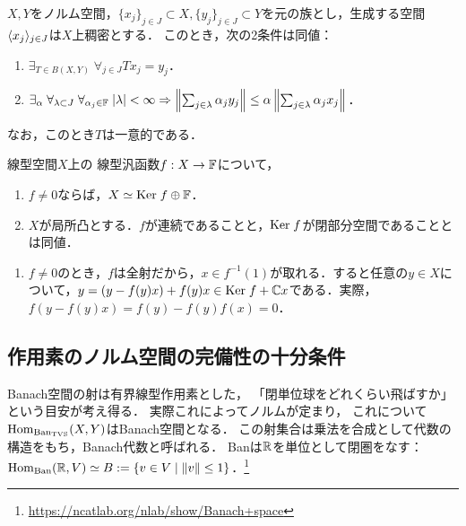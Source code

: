 \documentclass[uplatex,dvipdfmx]{jsreport}
\begin{document}
\begin{theorem}
    $X,Y$をノルム空間，$\{x_j\}_{j\in J}\subset X,\{y_j\}_{j\in J}\subset Y$を元の族とし，生成する空間$\langle x_j\rangle_{j\in J}$は$X$上稠密とする．
    このとき，次の2条件は同値：
    \begin{enumerate}
        \item $\exists_{T\in B(X,Y)}\;\forall_{j\in J}Tx_j=y_j$．
        \item $\exists_{\alpha}\;\forall_{\lambda\subset J}\;\forall_{\alpha_j\in\mathbb{F}}\;\lvert\lambda\rvert<\infty\Rightarrow\left\|\sum_{j\in\lambda}\alpha_jy_j\right\|\le\alpha\left\|\sum_{j\in\lambda}\alpha_jx_j\right\|$．
    \end{enumerate}
    なお，このとき$T$は一意的である．
\end{theorem}

\begin{proposition}[線型汎関数の連続性の特徴付け]
    線型空間$X$上の
    線型汎函数$f:X\to\mathbb{F}$について，
    \begin{enumerate}
        \item $f\ne 0$ならば，$X\simeq\mathrm{Ker}\; f\oplus\mathbb{F}$．
        \item $X$が局所凸とする．$f$が連続であることと，$\mathrm{Ker}\; f$が閉部分空間であることとは同値．
    \end{enumerate}
\end{proposition}
\begin{Proof}\mbox{}
    \begin{enumerate}
        \item $f\ne 0$のとき，$f$は全射だから，$x\in f^{-1}(1)$が取れる．すると任意の$y\in X$について，$y=(y-f(y)x)+f(y)x\in\mathrm{Ker}\; f+\mathbb{C} x$である．実際，$f(y-f(y)x)=f(y)-f(y)f(x)=0$．
    \end{enumerate}
\end{Proof}

\subsection{作用素のノルム空間の完備性の十分条件}

\begin{tcolorbox}[colframe=ForestGreen, colback=ForestGreen!10!white,breakable,colbacktitle=ForestGreen!40!white,coltitle=black,fonttitle=\bfseries\sffamily,
title=Banには内部homを持つ閉圏としての構造がある]
    Banach空間の射は有界線型作用素とした，
    「閉単位球をどれくらい飛ばすか」という目安が考え得る．
    実際これによってノルムが定まり，
    これについて$\mathrm{Hom}_{\mathrm{Ban}_{\mathrm{TVS}}}(X,Y)$はBanach空間となる．
    この射集合は乗法を合成として代数の構造をもち，Banach代数と呼ばれる．
    Banは$\mathbb{R}$を単位として閉圏をなす：$\mathrm{Hom}_{\mathrm{Ban}}(\mathbb{R},V)\simeq B:=\left\{v\in V\mid\|v\|\le 1\right\}$．\footnote{\url{https://ncatlab.org/nlab/show/Banach+space}}
\end{tcolorbox}
\end{document}
